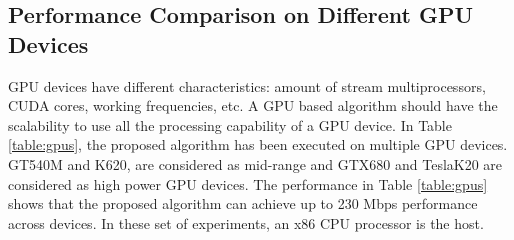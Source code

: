 \documentclass[conference]{IEEEtran}
\begin{document}
\subsection{Performance Comparison on Different GPU Devices}

GPU devices have different characteristics: amount of stream multiprocessors, CUDA cores, working frequencies, etc. A GPU based algorithm should have the scalability to use all the processing capability of a GPU device. In Table \ref{table:gpus}, the proposed algorithm has been executed on multiple GPU devices. GT540M and K620, are considered as mid-range and GTX680 and TeslaK20 are considered as high power GPU devices. The performance in Table \ref{table:gpus} shows that the proposed algorithm can achieve up to 230 Mbps performance across devices. In these set of experiments, an x86 CPU processor is the host.
\end{document}
